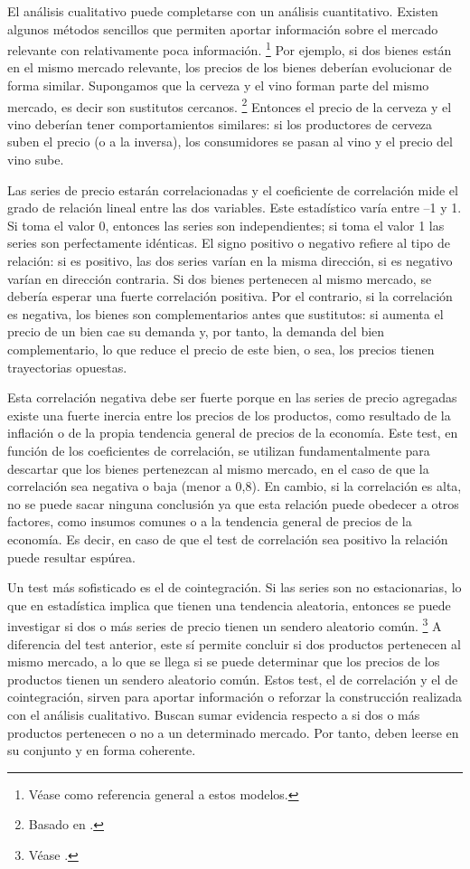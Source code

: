 \documentclass[
  12pt,
  spanish,
]{book}
\begin{document}
El análisis cualitativo puede completarse con un análisis cuantitativo.
Existen algunos métodos sencillos que permiten aportar información sobre
el mercado relevante con relativamente poca información. \footnote{Véase
  \citet{Haldrup2003} como referencia general a estos modelos.} Por
ejemplo, si dos bienes están en el mismo mercado relevante, los precios
de los bienes deberían evolucionar de forma similar. Supongamos que la
cerveza y el vino forman parte del mismo mercado, es decir son
sustitutos cercanos. \footnote{Basado en \citet{Zipitria2010}.} Entonces
el precio de la cerveza y el vino deberían tener comportamientos
similares: si los productores de cerveza suben el precio (o a la
inversa), los consumidores se pasan al vino y el precio del vino sube.

Las series de precio estarán correlacionadas y el coeficiente de
correlación mide el grado de relación lineal entre las dos variables.
Este estadístico varía entre --1 y 1. Si toma el valor 0, entonces las
series son independientes; si toma el valor 1 las series son
perfectamente idénticas. El signo positivo o negativo refiere al tipo de
relación: si es positivo, las dos series varían en la misma dirección,
si es negativo varían en dirección contraria. Si dos bienes pertenecen
al mismo mercado, se debería esperar una fuerte correlación positiva.
Por el contrario, si la correlación es negativa, los bienes son
complementarios antes que sustitutos: si aumenta el precio de un bien
cae su demanda y, por tanto, la demanda del bien complementario, lo que
reduce el precio de este bien, o sea, los precios tienen trayectorias
opuestas.

Esta correlación negativa debe ser fuerte porque en las series de precio
agregadas existe una fuerte inercia entre los precios de los productos,
como resultado de la inflación o de la propia tendencia general de
precios de la economía. Este test, en función de los coeficientes de
correlación, se utilizan fundamentalmente para descartar que los bienes
pertenezcan al mismo mercado, en el caso de que la correlación sea
negativa o baja (menor a 0,8). En cambio, si la correlación es alta, no
se puede sacar ninguna conclusión ya que esta relación puede obedecer a
otros factores, como insumos comunes o a la tendencia general de precios
de la economía. Es decir, en caso de que el test de correlación sea
positivo la relación puede resultar espúrea.

Un test más sofisticado es el de cointegración. Si las series son no
estacionarias, lo que en estadística implica que tienen una tendencia
aleatoria, entonces se puede investigar si dos o más series de precio
tienen un sendero aleatorio común. \footnote{Véase \citet{Haldrup2003}.}
A diferencia del test anterior, este sí permite concluir si dos
productos pertenecen al mismo mercado, a lo que se llega si se puede
determinar que los precios de los productos tienen un sendero aleatorio
común. Estos test, el de correlación y el de cointegración, sirven para
aportar información o reforzar la construcción realizada con el análisis
cualitativo. Buscan sumar evidencia respecto a si dos o más productos
pertenecen o no a un determinado mercado. Por tanto, deben leerse en su
conjunto y en forma coherente.
\end{document}
